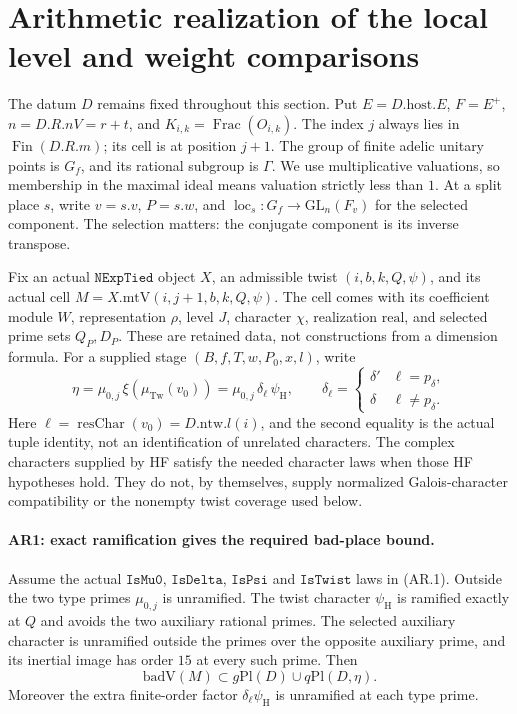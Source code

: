\section{Arithmetic realization of the local level and weight comparisons}
\label{sec:arithmetic-realization}

The datum $D$ remains fixed throughout this section. Put $E=D.\mathrm{host}.E$,
$F=E^+$, $n=D.R.nV=r+t$, and $K_{i,k}=\operatorname{Frac}(O_{i,k})$.
The index $j$ always lies in $\operatorname{Fin}(D.R.m)$; its cell is at
position $j+1$. The group of finite adelic unitary points is $G_f$, and its
rational subgroup is $\Gamma$. We use multiplicative valuations, so
membership in the maximal ideal means valuation strictly less than $1$.
At a split place $s$, write $v=s.v$, $P=s.w$, and
$\operatorname{loc}_s:G_f\to\mathrm{GL}_n(F_v)$ for the selected component.
The selection matters: the conjugate component is its inverse transpose.

Fix an actual $\texttt{NExpTied}$ object $X$, an admissible twist
$(i,b,k,Q,\psi)$, and its actual cell $M=X.\mathrm{mtV}(i,j+1,b,k,Q,\psi)$.
The cell comes with its coefficient module $W$, representation $\rho$,
level $J$, character $\chi$, realization $\mathrm{real}$, and selected
prime sets $Q_P,D_P$. These are retained data, not constructions from a
dimension formula. For a supplied stage $(B,f,T,w,P_0,x,l)$, write
\[
 \eta=\mu_{0,j}\,\xi(\mu_{\mathrm{Tw}}(v_0))
      =\mu_{0,j}\,\delta_\ell\,\psi_{\mathrm H},
 \qquad
 \delta_\ell=\begin{cases}\delta'&\ell=p_\delta,\\
                          \delta&\ell\ne p_\delta.\end{cases}       \tag{AR.1}
\]
Here $\ell=\operatorname{resChar}(v_0)=D.\mathrm{ntw}.l(i)$, and the
second equality is the actual tuple identity, not an identification of
unrelated characters. The complex characters supplied by HF satisfy the
needed character laws when those HF hypotheses hold. They do not, by
themselves, supply normalized Galois-character compatibility or the
nonempty twist coverage used below.

\paragraph{AR1: exact ramification gives the required bad-place bound.}
Assume the actual $\texttt{IsMu0}$, $\texttt{IsDelta}$,
$\texttt{IsPsi}$ and $\texttt{IsTwist}$ laws in (AR.1).
Outside the two type primes $\mu_{0,j}$ is unramified. The twist character
$\psi_{\mathrm H}$ is ramified exactly at $Q$ and avoids the two auxiliary
rational primes. The selected auxiliary character is unramified outside
the primes over the opposite auxiliary prime, and its inertial image has
order $15$ at every such prime. Then
\[
 \mathrm{badV}(M)\subset g\mathrm{Pl}(D)\cup q\mathrm{Pl}(D,\eta).
                                                               \tag{AR.2}
\]
Moreover the extra finite-order factor $\delta_\ell\psi_{\mathrm H}$ is
unramified at each type prime.

